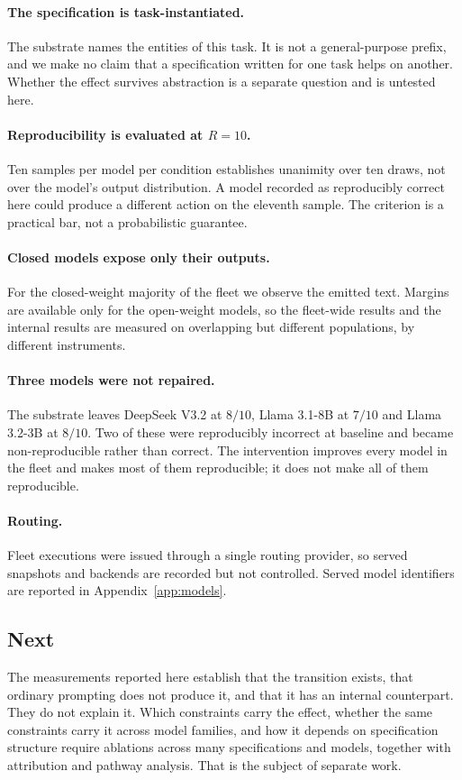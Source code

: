 \paragraph{The specification is task-instantiated.}
The substrate names the entities of this task. It is not a general-purpose prefix,
and we make no claim that a specification written for one task helps on another.
Whether the effect survives abstraction is a separate question and is untested here.

\paragraph{Reproducibility is evaluated at $R=10$.}
Ten samples per model per condition establishes unanimity over ten draws, not over
the model's output distribution. A model recorded as reproducibly correct here could
produce a different action on the eleventh sample. The criterion is a practical bar,
not a probabilistic guarantee.

\paragraph{Closed models expose only their outputs.}
For the closed-weight majority of the fleet we observe the emitted text. Margins are
available only for the open-weight models, so the fleet-wide results and the
internal results are measured on overlapping but different populations, by different
instruments.

\paragraph{Three models were not repaired.}
The substrate leaves DeepSeek V3.2 at $8/10$, Llama 3.1-8B at $7/10$ and
Llama 3.2-3B at $8/10$. Two of these were reproducibly incorrect at baseline and
became non-reproducible rather than correct. The intervention improves every model
in the fleet and makes most of them reproducible; it does not make all of them
reproducible.

\paragraph{Routing.}
Fleet executions were issued through a single routing provider, so served snapshots
and backends are recorded but not controlled. Served model identifiers are reported
in Appendix~\ref{app:models}.

\subsection{Next}

The measurements reported here establish that the transition exists, that ordinary
prompting does not produce it, and that it has an internal counterpart. They do not
explain it. Which constraints carry the effect, whether the same constraints carry it
across model families, and how it depends on specification structure require
ablations across many specifications and models, together with attribution and
pathway analysis. That is the subject of separate work.
